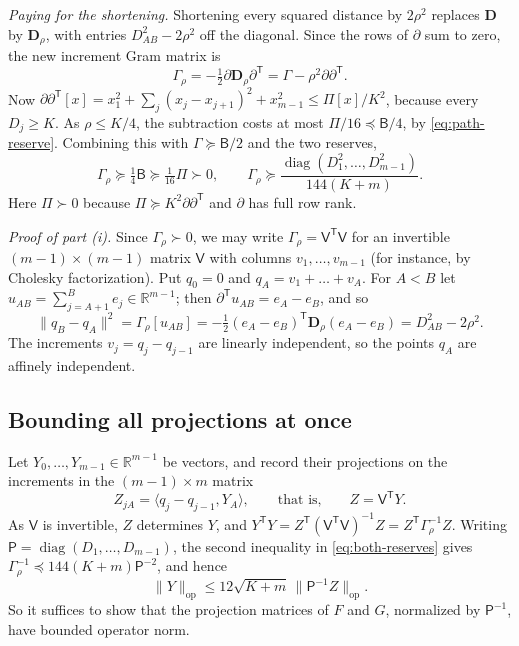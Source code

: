 \documentclass[11pt]{amsart}
\numberwithin{equation}{section}
\theoremstyle{definition}
\theoremstyle{remark}
\newcommand{\R}{\mathbb R}
\newcommand{\ip}[2]{\langle #1,#2\rangle}
\newcommand{\norm}[1]{\lVert #1\rVert}
\newcommand{\opnorm}[1]{\lVert #1\rVert_{\mathrm{op}}}
\newcommand{\T}{\mathsf T}          %
\DeclareMathOperator{\diag}{diag}
\begin{document}
\emph{Paying for the shortening.} Shortening every squared distance by
$2\rho^2$ replaces $\mathbf D$ by $\mathbf D_\rho$, with entries
$D_{AB}^2-2\rho^2$ off the diagonal. Since the rows of $\partial$ sum to
zero, the new increment Gram matrix is
\[
 \Gamma_\rho=-\tfrac12\partial\mathbf D_\rho\partial^\T
 =\Gamma-\rho^2\partial\partial^\T.
\]
Now $\partial\partial^\T[x]=x_1^2+\sum_j(x_j-x_{j+1})^2+x_{m-1}^2\le
\Pi[x]/K^2$, because every $D_j\ge K$. As $\rho\le K/4$, the subtraction
costs at most $\Pi/16\preceq\mathsf B/4$, by \eqref{eq:path-reserve}.
Combining this with $\Gamma\succeq\mathsf B/2$ and the two reserves,
\begin{equation}\label{eq:both-reserves}
 \Gamma_\rho\succeq\tfrac14\mathsf B\succeq\tfrac1{16}\Pi\succ0,
 \qquad
 \Gamma_\rho\succeq
     \frac{\diag(D_1^2,\ldots,D_{m-1}^2)}{144(K+m)}.
\end{equation}
Here $\Pi\succ0$ because $\Pi\succeq K^2\partial\partial^\T$ and $\partial$
has full row rank.

\emph{Proof of part (i).} Since $\Gamma_\rho\succ0$, we may write
$\Gamma_\rho=\mathsf V^\T\mathsf V$ for an invertible
$(m-1)\times(m-1)$ matrix $\mathsf V$ with columns $v_1,\dots,v_{m-1}$
(for instance, by Cholesky factorization). Put $q_0=0$ and
$q_A=v_1+\dots+v_A$. For $A<B$ let $u_{AB}=\sum_{j=A+1}^Be_j\in\R^{m-1}$;
then $\partial^\T u_{AB}=e_A-e_B$, and so
\[
 \norm{q_B-q_A}^2
 =\Gamma_\rho[u_{AB}]
 =-\tfrac12(e_A-e_B)^\T\mathbf D_\rho(e_A-e_B)
 =D_{AB}^2-2\rho^2.
\]
The increments $v_j=q_j-q_{j-1}$ are linearly independent, so the points
$q_A$ are affinely independent.

\subsection{Bounding all projections at once}\label{sec:app-projections}

Let $Y_0,\dots,Y_{m-1}\in\R^{m-1}$ be vectors, and record their
projections on the increments in the $(m-1)\times m$ matrix
\[
 Z_{jA}=\ip{q_j-q_{j-1}}{Y_A},\qquad\text{that is,}\qquad Z=\mathsf V^\T Y.
\]
As $\mathsf V$ is invertible, $Z$ determines $Y$, and
$Y^\T Y=Z^\T(\mathsf V^\T\mathsf V)^{-1}Z=Z^\T\Gamma_\rho^{-1}Z$. Writing
$\mathsf P=\diag(D_1,\dots,D_{m-1})$, the second inequality in
\eqref{eq:both-reserves} gives
$\Gamma_\rho^{-1}\preceq144(K+m)\mathsf P^{-2}$, and hence
\begin{equation}\label{eq:whole-solve}
 \opnorm Y\le12\sqrt{K+m}\,\opnorm{\mathsf P^{-1}Z}.
\end{equation}
So it suffices to show that the projection matrices of $F$ and $G$,
normalized by $\mathsf P^{-1}$, have bounded operator norm.
\end{document}
